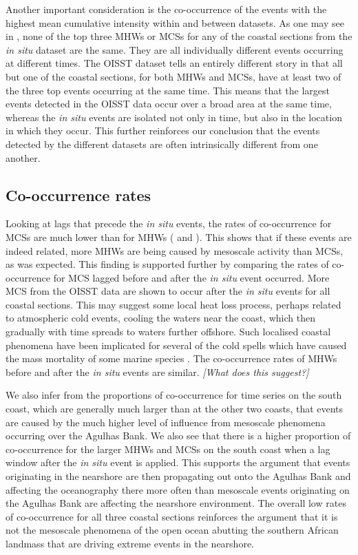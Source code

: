\documentclass[a4paper,10pt,review]{elsarticle}
\begin{document}
Another important consideration is the co-occurrence of the events with the highest mean cumulative intensity within and between datasets. As one may see in , none of the top three MHWs or MCSs for any of the coastal sections from the \emph{in situ} dataset are the same. They are all individually different events occurring at different times. The OISST dataset tells an entirely different story in that all but one of the coastal sections, for both MHWs and MCSs, have at least two of the three top events occurring at the same time. This means that the largest events detected in the OISST data occur over a broad area at the same time, whereas the \emph{in situ} events are isolated not only in time, but also in the location in which they occur. This further reinforces our conclusion that the events detected by the different datasets are often intrinsically different from one another.

\subsection{Co-occurrence rates}
Looking at lags that precede the \emph{in situ} events, the rates of co-occurrence for MCSs are much lower than for MHWs ( and ). This shows that if these events are indeed related, more MHWs are being caused by mesoscale activity than MCSs, as was expected. This finding is supported further by comparing the rates of co-occurrence for MCS lagged before and after the \emph{in situ} event occurred. More MCS from the OISST data are shown to occur after the \emph{in situ} events for all coastal sections. This may suggest some local heat loss process, perhaps related to atmospheric cold events, cooling the waters near the coast, which then gradually with time spreads to waters further offshore. Such localised coastal phenomena have been implicated for several of the cold spells which have caused the mass mortality of some marine species \citep[e.g.][]{Gunter1941, Firth2011}. The co-occurrence rates of MHWs before and after the \emph{in situ} events are similar. \emph{[What does this suggest?]}

We also infer from the proportions of co-occurrence for time series on the south coast, which are generally much larger than at the other two coasts, that events are caused by the much higher level of influence from mesoscale phenomena occurring over the Agulhas Bank. We also see that there is a higher proportion of co-occurrence for the larger MHWs and MCSs on the south coast when a lag window after the \emph{in situ} event is applied. This supports the argument that events originating in the nearshore are then propagating out onto the Agulhas Bank and affecting the oceanography there more often than mesoscale events originating on the Agulhas Bank are affecting the nearshore environment. The overall low rates of co-occurrence for all three coastal sections reinforces the argument that it is not the mesoscale phenomena of the open ocean abutting the southern African landmass that are driving extreme events in the nearshore.
\end{document}
